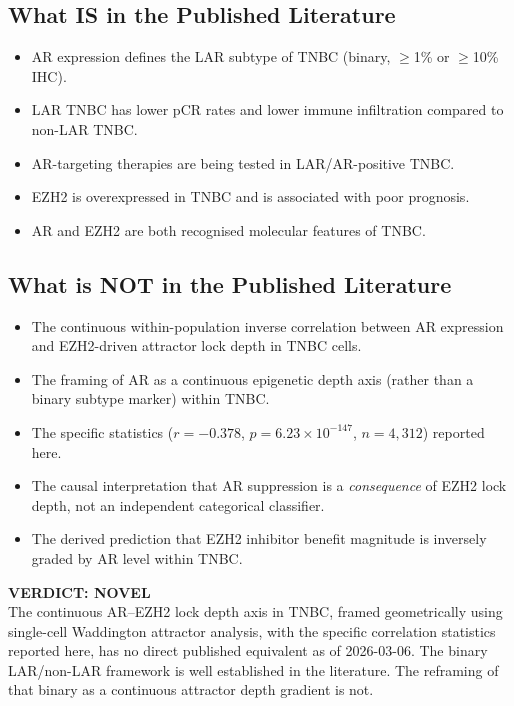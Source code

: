 \documentclass[12pt, a4paper]{article}
\begin{document}
\subsection{What IS in the Published Literature}

\begin{itemize}
    \item AR expression defines the LAR subtype
    of TNBC (binary, $\geq$1\% or $\geq$10\%
    IHC).
    \item LAR TNBC has lower pCR rates and lower
    immune infiltration compared to non-LAR TNBC.
    \item AR-targeting therapies are being tested
    in LAR/AR-positive TNBC.
    \item EZH2 is overexpressed in TNBC and is
    associated with poor prognosis.
    \item AR and EZH2 are both recognised
    molecular features of TNBC.
\end{itemize}

\subsection{What is NOT in the Published
Literature}

\begin{itemize}
    \item The continuous within-population
    inverse correlation between AR expression
    and EZH2-driven attractor lock depth in
    TNBC cells.
    \item The framing of AR as a continuous
    epigenetic depth axis (rather than a binary
    subtype marker) within TNBC.
    \item The specific statistics
    ($r = -0.378$, $p = 6.23 \times 10^{-147}$,
    $n = 4{,}312$) reported here.
    \item The causal interpretation that AR
    suppression is a \textit{consequence} of
    EZH2 lock depth, not an independent
    categorical classifier.
    \item The derived prediction that EZH2
    inhibitor benefit magnitude is inversely
    graded by AR level within TNBC.
\end{itemize}

\begin{center}
\colorbox{novelbox}{
\begin{minipage}{0.88\textwidth}
\vspace{0.5em}
\textbf{VERDICT: NOVEL}\\[0.3em]
The continuous AR--EZH2 lock depth axis in
TNBC, framed geometrically using single-cell
Waddington attractor analysis, with the specific
correlation statistics reported here, has no
direct published equivalent as of 2026-03-06.
The binary LAR/non-LAR framework is well
established in the literature. The reframing
of that binary as a continuous attractor
depth gradient is not.
\vspace{0.5em}
\end{minipage}}
\end{center}
\end{document}
